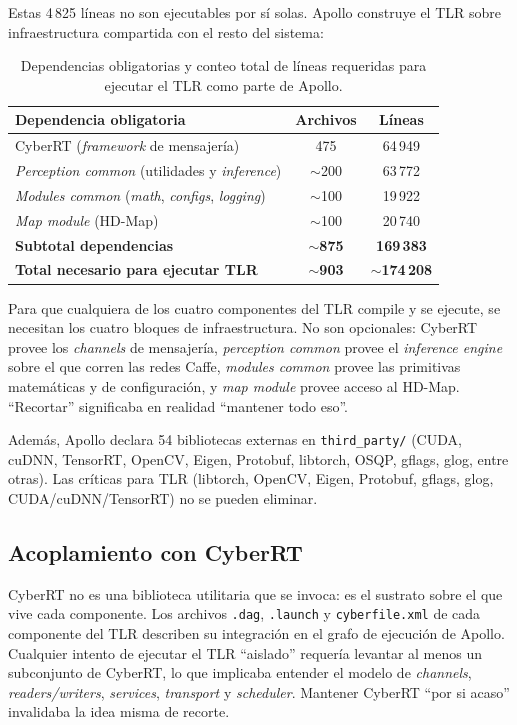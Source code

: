 Estas 4\,825 líneas no son ejecutables por sí solas. Apollo construye el TLR sobre infraestructura compartida con el resto del sistema:

\begin{table}[H]
\centering
\begin{tabular}{|l|c|c|}
\hline
\textbf{Dependencia obligatoria} & \textbf{Archivos} & \textbf{Líneas} \\
\hline
CyberRT (\textit{framework} de mensajería) & 475 & 64\,949 \\
\textit{Perception common} (utilidades y \textit{inference}) & $\sim$200 & 63\,772 \\
\textit{Modules common} (\textit{math}, \textit{configs}, \textit{logging}) & $\sim$100 & 19\,922 \\
\textit{Map module} (HD-Map) & $\sim$100 & 20\,740 \\
\hline
\textbf{Subtotal dependencias} & \textbf{$\sim$875} & \textbf{169\,383} \\
\hline
\hline
\textbf{Total necesario para ejecutar TLR} & \textbf{$\sim$903} & \textbf{$\sim$174\,208} \\
\hline
\end{tabular}
\caption{Dependencias obligatorias y conteo total de líneas requeridas para ejecutar el TLR como parte de Apollo.}
\end{table}

Para que cualquiera de los cuatro componentes del TLR compile y se ejecute, se necesitan los cuatro bloques de infraestructura. No son opcionales: CyberRT provee los \textit{channels} de mensajería, \textit{perception common} provee el \textit{inference engine} sobre el que corren las redes Caffe, \textit{modules common} provee las primitivas matemáticas y de configuración, y \textit{map module} provee acceso al HD-Map. ``Recortar'' significaba en realidad ``mantener todo eso''.

Además, Apollo declara 54 bibliotecas externas en \texttt{third\_party/} (CUDA, cuDNN, TensorRT, OpenCV, Eigen, Protobuf, libtorch, OSQP, gflags, glog, entre otras). Las críticas para TLR (libtorch, OpenCV, Eigen, Protobuf, gflags, glog, CUDA/cuDNN/TensorRT) no se pueden eliminar.

\subsection{Acoplamiento con CyberRT}

CyberRT no es una biblioteca utilitaria que se invoca: es el sustrato sobre el que vive cada componente. Los archivos \texttt{.dag}, \texttt{.launch} y \texttt{cyberfile.xml} de cada componente del TLR describen su integración en el grafo de ejecución de Apollo. Cualquier intento de ejecutar el TLR ``aislado'' requería levantar al menos un subconjunto de CyberRT, lo que implicaba entender el modelo de \textit{channels}, \textit{readers/writers}, \textit{services}, \textit{transport} y \textit{scheduler}. Mantener CyberRT ``por si acaso'' invalidaba la idea misma de recorte.

